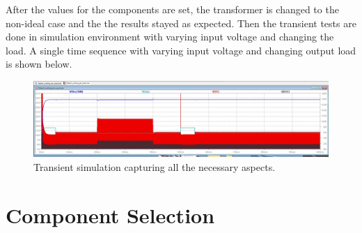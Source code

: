 \documentclass[12pt]{article}
\begin{document}
    After the values for the components are set, the transformer is changed to the non-ideal case and the the results stayed as expected. Then the transient tests are done in simulation environment with varying input voltage and changing the load. A single time sequence with varying input voltage and changing output load is shown below. \\

    \begin{figure}[H]
        \centering
        \includegraphics[scale=0.4]{img/sim.png}
        \caption{Transient simulation capturing all the necessary aspects.}
        \label{fig:sim}
    \end{figure}

    

    

    
\section{Component Selection}
\end{document}
